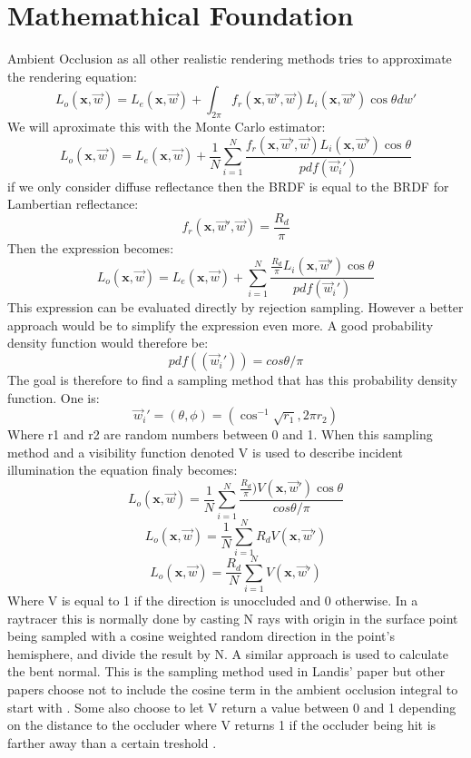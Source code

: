 \section{Mathemathical Foundation}
Ambient Occlusion as all other realistic rendering methods tries to approximate the rendering equation:
\[ 
L_o(\textbf{x},\overrightarrow{w}) = 
L_e(\textbf{x},\overrightarrow{w}) +
\int_{2\pi}
 f_r(\textbf{x},\overrightarrow{w}',\overrightarrow{w} )L_i(\textbf{x},\overrightarrow{w}')\cos\theta dw'
\]
We will aproximate this with the Monte Carlo estimator\cite{Dutre2001}:
\[ 
L_o(\textbf{x},\overrightarrow{w}) = 
L_e(\textbf{x},\overrightarrow{w}) +
\frac{1}{N}
\sum_{i=1}^N \frac{ 
 f_r(\textbf{x},\overrightarrow{w}',\overrightarrow{w} )L_i(\textbf{x},\overrightarrow{w}')\cos\theta
}
{
pdf(\overrightarrow{w}_i')
}
\]
if we only consider diffuse reflectance then the BRDF is equal to the BRDF for Lambertian reflectance:
\[
 f_r(\textbf{x},\overrightarrow{w}',\overrightarrow{w}) = \frac{R_d}{\pi}
\]
Then the expression becomes:
\[ 
L_o(\textbf{x},\overrightarrow{w}) = 
L_e(\textbf{x},\overrightarrow{w}) +
\sum_{i=1}^N \frac{ 
\frac{R_d}{\pi}L_i(\textbf{x},\overrightarrow{w}')\cos\theta
}
{
pdf(\overrightarrow{w}_i')
}
\]
This expression can be evaluated directly by rejection sampling. However a better approach would be to simplify the expression even more. A good probability density function would therefore be\cite{Dutre2001}:
\[
pdf((\overrightarrow{w}_i')) = cos\theta / \pi
\]
The goal is therefore to find a sampling method that has this probability density function. One is\cite{Dutre2001}:
\[
\overrightarrow{w}_i' = (\theta,\phi) =
(\cos^{-1}\sqrt{r_1},2\pi r_2)
\]
Where r1 and r2 are random numbers between 0 and 1.
When this sampling method and a visibility function denoted V is used to describe incident illumination the equation finaly becomes:
\[ 
L_o(\textbf{x},\overrightarrow{w}) = 
\frac{1}{N}
\sum_{i=1}^N \frac{ 
\frac{R_d}{\pi})V(\textbf{x},\overrightarrow{w}')\cos\theta
}
{
cos\theta / \pi
}
\]
\[ 
L_o(\textbf{x},\overrightarrow{w}) = 
\frac{1}{N}
\sum_{i=1}^N
R_d V(\textbf{x},\overrightarrow{w}')
\]
\[ 
L_o(\textbf{x},\overrightarrow{w}) = 
\frac{R_d}{N} \sum_{i=1}^N V(\textbf{x},\overrightarrow{w}')
\]
Where V is equal to 1 if the direction is unoccluded and 0 otherwise. In a raytracer this is normally done by casting N rays with origin in the surface point being sampled with a cosine weighted random direction in the point's hemisphere, and divide the result by N. A similar approach is used to calculate the bent normal. This is the sampling method used in Landis' paper\cite{Landis2002} but other papers choose not to include the cosine term in the ambient occlusion integral to start with \cite{KRES2011}. Some also choose to let V return a value between 0 and 1 depending on the distance to the occluder where V returns 1 if the occluder being hit is farther away than a certain treshold \cite{McGuire:2010}. 
  
